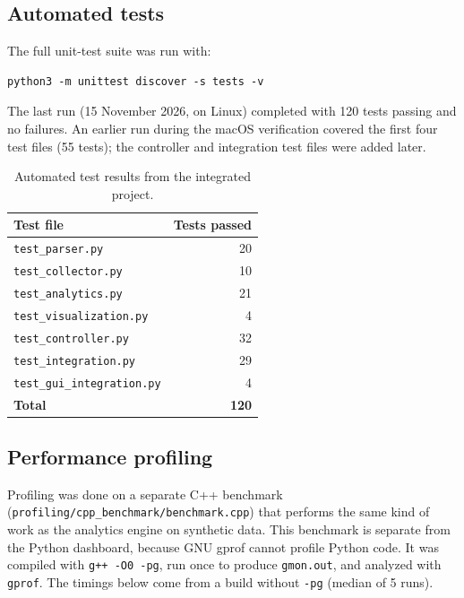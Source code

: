 \documentclass[11pt,a4paper]{article}
\begin{document}
\subsection{Automated tests}

The full unit-test suite was run with:

\begin{lstlisting}
python3 -m unittest discover -s tests -v
\end{lstlisting}

The last run (15 November 2026, on Linux) completed with 120 tests passing and
no failures. An earlier run during the macOS verification covered the first four
test files (55 tests); the controller and integration test files were added later.

\begin{table}[H]
\centering
\begin{tabular}{lr}
\toprule
\textbf{Test file} & \textbf{Tests passed} \\
\midrule
\texttt{test\_parser.py} & 20 \\
\texttt{test\_collector.py} & 10 \\
\texttt{test\_analytics.py} & 21 \\
\texttt{test\_visualization.py} & 4 \\
\texttt{test\_controller.py} & 32 \\
\texttt{test\_integration.py} & 29 \\
\texttt{test\_gui\_integration.py} & 4 \\
\midrule
\textbf{Total} & \textbf{120} \\
\bottomrule
\end{tabular}
\caption{Automated test results from the integrated project.}
\end{table}

\subsection{Performance profiling}

Profiling was done on a separate C++ benchmark
(\texttt{profiling/cpp\_benchmark/benchmark.cpp}) that performs the same kind of
work as the analytics engine on synthetic data. This benchmark is separate from
the Python dashboard, because GNU gprof cannot profile Python code. It was compiled
with \texttt{g++ -O0 -pg}, run once to produce \texttt{gmon.out}, and analyzed
with \texttt{gprof}. The timings below come from a build without \texttt{-pg}
(median of 5 runs).
\end{document}
